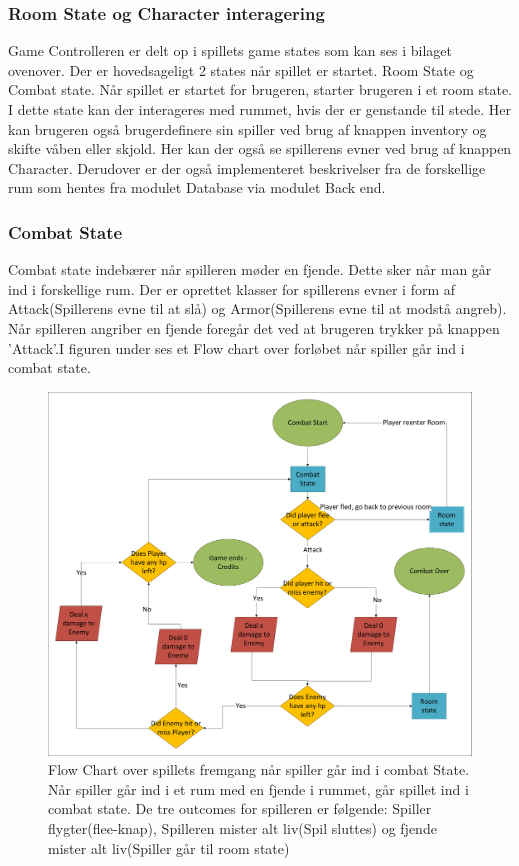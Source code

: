 \subsubsection{Room State og Character interagering}
Game Controlleren er delt op i spillets game states som kan ses i bilaget ovenover. Der er hovedsageligt 2 states når spillet er startet. Room State og Combat state. Når spillet er startet for brugeren, starter brugeren i et room state. I dette state kan der interageres med rummet, hvis der er genstande til stede. Her kan brugeren også brugerdefinere sin spiller ved brug af knappen inventory og skifte våben eller skjold. Her kan der også se spillerens evner ved brug af knappen Character. Derudover er der også implementeret beskrivelser fra de forskellige rum som hentes fra modulet Database via modulet Back end.
\subsubsection{Combat State}
Combat state indebærer når spilleren møder en fjende. Dette sker når man går ind i forskellige rum. Der er oprettet klasser for spillerens evner i form af Attack(Spillerens evne til at slå) og Armor(Spillerens evne til at modstå angreb). Når spilleren angriber en fjende foregår det ved at brugeren trykker på knappen ’Attack’.I figuren under ses et Flow chart over forløbet når spiller går ind i combat state.
\begin{figure}[H]
\centering
\includegraphics[width = \textwidth]{02-Body/Images/Arkitektur - Combat State.pdf}
\caption{Flow Chart over spillets fremgang når spiller går ind i combat State. Når spiller går ind i et rum med en fjende i rummet, går spillet ind i combat state.  De tre outcomes for spilleren er følgende: Spiller flygter(flee-knap), Spilleren mister alt liv(Spil sluttes) og fjende mister alt liv(Spiller går til room state)}
\end{figure}
